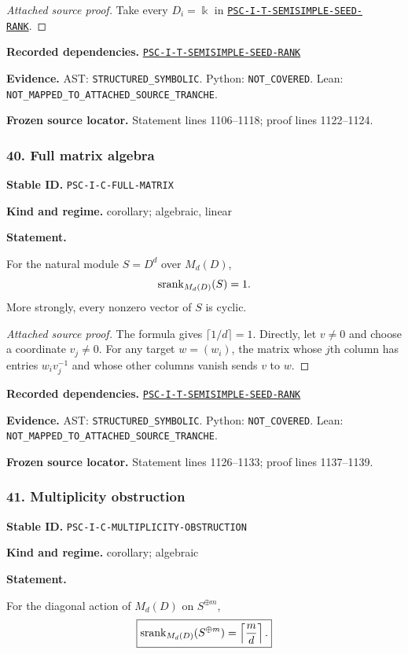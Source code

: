 \documentclass[a4paper,11pt]{article}
\newcommand{\bbk}{\Bbbk}\newcommand{\A}{\mathcal A}\newcommand{\B}{\mathcal B}\newcommand{\Ccal}{\mathcal C}\newcommand{\Pcal}{\mathcal P}\newcommand{\Qcal}{\mathcal Q}\newcommand{\Rcal}{\mathcal R}\newcommand{\Scal}{\mathcal S}
\newcommand{\field}[2]{\noindent\textbf{#1.} #2\par}
\begin{document}
\begin{proof}[Attached source proof]
Take every $D_i=\bbk$ in \hyperref[rec:PSC-I-T-SEMISIMPLE-SEED-RANK]{\nolinkurl{PSC-I-T-SEMISIMPLE-SEED-RANK}}.
\end{proof}
\field{Recorded dependencies}{\hyperref[rec:PSC-I-T-SEMISIMPLE-SEED-RANK]{\nolinkurl{PSC-I-T-SEMISIMPLE-SEED-RANK}}}
\field{Evidence}{AST: \nolinkurl{STRUCTURED_SYMBOLIC}. Python: \nolinkurl{NOT_COVERED}. Lean: \nolinkurl{NOT_MAPPED_TO_ATTACHED_SOURCE_TRANCHE}.}
\field{Frozen source locator}{Statement lines 1106--1118; proof lines 1122--1124.}
\subsubsection*{40. Full matrix algebra}
\label{rec:PSC-I-C-FULL-MATRIX}
\field{Stable ID}{\nolinkurl{PSC-I-C-FULL-MATRIX}}
\field{Kind and regime}{corollary; algebraic, linear}
\textbf{Statement.}\par
For the natural module $S=D^d$ over $M_d(D)$,
\[
\operatorname{srank}_{M_d(D)}(S)=1.
\]
More strongly, every nonzero vector of $S$ is cyclic.

\begin{proof}[Attached source proof]
The formula gives $\lceil1/d\rceil=1$.  Directly, let $v\neq0$ and choose a coordinate $v_j\neq0$.  For any target $w=(w_i)$, the matrix whose $j$th column has entries $w_iv_j^{-1}$ and whose other columns vanish sends $v$ to $w$.
\end{proof}
\field{Recorded dependencies}{\hyperref[rec:PSC-I-T-SEMISIMPLE-SEED-RANK]{\nolinkurl{PSC-I-T-SEMISIMPLE-SEED-RANK}}}
\field{Evidence}{AST: \nolinkurl{STRUCTURED_SYMBOLIC}. Python: \nolinkurl{NOT_COVERED}. Lean: \nolinkurl{NOT_MAPPED_TO_ATTACHED_SOURCE_TRANCHE}.}
\field{Frozen source locator}{Statement lines 1126--1133; proof lines 1137--1139.}
\subsubsection*{41. Multiplicity obstruction}
\label{rec:PSC-I-C-MULTIPLICITY-OBSTRUCTION}
\field{Stable ID}{\nolinkurl{PSC-I-C-MULTIPLICITY-OBSTRUCTION}}
\field{Kind and regime}{corollary; algebraic}
\textbf{Statement.}\par
For the diagonal action of $M_d(D)$ on $S^{\oplus m}$,
\[
\boxed{
\operatorname{srank}_{M_d(D)}(S^{\oplus m})
=
\left\lceil\frac{m}{d}\right\rceil.
}
\]
\end{document}
